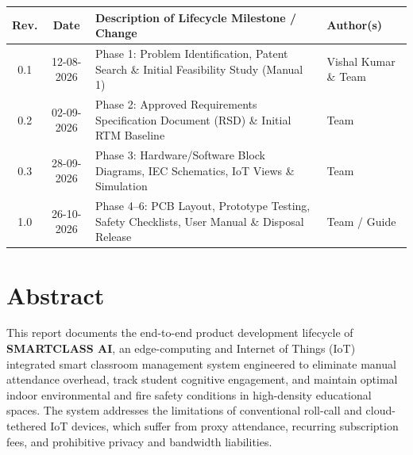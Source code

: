 \documentclass[11pt,a4paper]{article}
\begin{document}
\begin{table}[h!]
\centering
\begin{tabular}{|c|c|p{8.5cm}|p{3.5cm}|}
\hline
\textbf{Rev.} & \textbf{Date} & \textbf{Description of Lifecycle Milestone / Change} & \textbf{Author(s)} \\ \hline
0.1 & 12-08-2026 & Phase 1: Problem Identification, Patent Search \& Initial Feasibility Study (Manual 1) & Vishal Kumar \& Team \\ \hline
0.2 & 02-09-2026 & Phase 2: Approved Requirements Specification Document (RSD) \& Initial RTM Baseline & Team \\ \hline
0.3 & 28-09-2026 & Phase 3: Hardware/Software Block Diagrams, IEC Schematics, IoT Views \& Simulation & Team \\ \hline
1.0 & 26-10-2026 & Phase 4–6: PCB Layout, Prototype Testing, Safety Checklists, User Manual \& Disposal Release & Team / Guide \\ \hline
\end{tabular}
\end{table}

\vspace{0.8cm}
\noindent{}

\newpage
\section*{Abstract}
This report documents the end-to-end product development lifecycle of \textbf{SMARTCLASS AI}, an edge-computing and Internet of Things (IoT) integrated smart classroom management system engineered to eliminate manual attendance overhead, track student cognitive engagement, and maintain optimal indoor environmental and fire safety conditions in high-density educational spaces. The system addresses the limitations of conventional roll-call and cloud-tethered IoT devices, which suffer from proxy attendance, recurring subscription fees, and prohibitive privacy and bandwidth liabilities.
\end{document}
